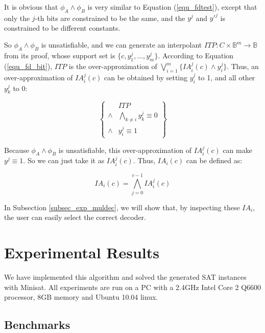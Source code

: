\documentclass[journal]{IEEEtran}
\begin{document}
It is obvious that $\phi_A\wedge \phi_B$ is very similar to Equation (\ref{equ_fdtest}),
except that only the $j$-th bits are constrained to be the same,
and the $y^j$ and $y'^j$ is constrained to be different constants.

So $\phi_A\wedge \phi_B$ is unsatisfiable,
and we can generate an interpolant $ITP:C\times\mathbb{B}^m\to \mathbb{B}$ from its proof,
whose support set is $\{c,y^j_1,\dots,y^j_m\}$.
According to Equation (\ref{equ_fd_bit}),
$ITP$ is the over-approximation of $\bigvee _{i=1}^{m} \{IA^j_i(c)\wedge y^j_i\}$.
Thus,
an over-approximation of $IA^j_i(c)$ can be obtained by setting $y^j_i$ to 1,
and all other $y^j_k$ to 0:

\begin{equation}\label{equ_fdtestbitIA}
\left\{
\begin{array}{cc}
      & ITP  \\
\wedge&\bigwedge_{k\ne i} y^j_k\equiv 0 \\
\wedge& y^j_i\equiv 1
\end{array}
\right\}
\end{equation}

Because $\phi_A\wedge \phi_B$ is unsatisfiable,
this over-approximation of $IA^j_i(c)$ can make $y^j\equiv 1$.
So we can just take it as $IA^j_i(c)$.
Thus,
$IA_i(c)$ can be defined as:

\begin{equation}\label{equ_fd_iabit}
IA_i(c)=\bigwedge _{j=0}^{v-1} IA^j_i(c)
\end{equation}

In Subsection \ref{subsec_exp_muldec},
we will show that,
by inspecting these $IA_i$,
the user can easily select the correct decoder.

\section{Experimental Results}\label{sec_exp}
We have implemented this algorithm
and solved the generated SAT instances with Minisat\cite{EXTSAT}.
All experiments are run on a PC with a 2.4GHz Intel Core 2 Q6600 processor, 8GB memory and Ubuntu 10.04 linux.
\subsection{Benchmarks}\label{subsec_expbench}
\end{document}
